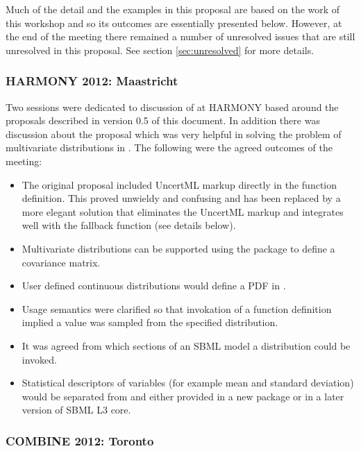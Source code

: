 \documentclass[draftspec]{sbmlpkgspec}
\begin{document}
Much of the detail and the examples in this proposal are based on
the work of this workshop and so its outcomes are essentially
presented below. However, at the end of the meeting there remained a
number of unresolved issues that are still unresolved in this
proposal. See section \vref{sec:unresolved} for more details.


\subsubsection{HARMONY 2012: Maastricht}

Two sessions were dedicated to discussion of \distrib at HARMONY based
around the proposals described in version 0.5 of this document. In
addition there was discussion about the \arrays proposal which was
very helpful in solving the problem of multivariate distributions in
\distrib. The following were the agreed outcomes of the meeting:

\begin{itemize}
\item The original proposal included UncertML markup directly in the
  function definition. This proved unwieldy and confusing and has been
  replaced by a more elegant solution that eliminates the UncertML
  markup and integrates well with the fallback function (see details
  below).
\item Multivariate distributions can be supported using the \arrays
  package to define a covariance matrix.
\item User defined continuous distributions would define a PDF in
  \mathml.
\item Usage semantics were clarified so that invokation of a function
  definition implied a value was sampled from the specified
  distribution.
\item It was agreed from which sections of an SBML model a
  distribution could be invoked.
\item Statistical descriptors of variables (for
  example mean and standard deviation) would be separated from
  \distrib and either provided in a new package or in a later version
  of SBML L3 core.
\end{itemize}

\subsubsection{COMBINE 2012: Toronto}
\end{document}
